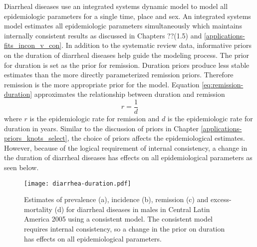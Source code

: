 Diarrheal diseases use an integrated systems dynamic model to model all epidemiologic parameters for a single time, place and sex.  An integrated systems model estimates all epidemiologic parameters simultaneously which maintains internally consistent results as discussed in Chapters ??(1.5) and \ref{applications-fits_incon_v_con}.  In addition to the systematic review data, informative priors  on the duration of diarrheal diseases help guide the modeling process.  The prior for duration is set as the prior for remission.  Duration priors produce less stable estimates than the more directly parameterized remission priors.  Therefore remission is the more appropriate prior for the model.  Equation \ref{eq:remission-duration} approximates the relationship between duration and remission
    \begin{equation} \label{eq:remission-duration}
    	r = \frac{1}{d}
    \end{equation}
where $r$ is the epidemiologic rate for remission and $d$ is the epidemiologic rate for duration in years.  Similar to the discussion of priors in Chapter \ref{applications-priors_knots_select}, the choice of priors affects the epidemiological estimates.  However, because of the logical requirement of internal consistency, a change in the duration of diarrheal diseases has effects on all epidemiological parameters as seen below.

    \begin{figure}[h]
        \begin{center}
            \texttt{[image: diarrhea-duration.pdf]}
            \caption{Estimates of prevalence (a), incidence (b), remission (c) and excess-mortality (d) for diarrheal diseases in males in Central Latin America 2005 using a consistent model.  The consistent model requires internal consistency, so a change in the prior on duration has effects on all epidemiological parameters.}
            \label{fig:app-hepc regional rfx}
        \end{center}
    \end{figure}

